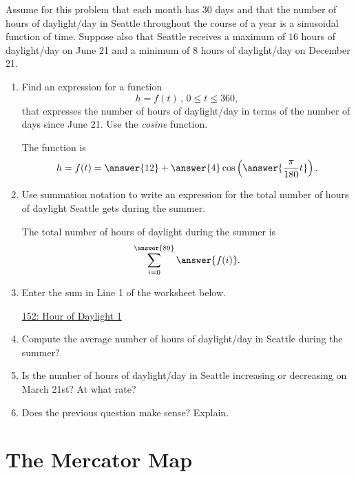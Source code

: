 \documentclass{ximera}
\begin{document}
\begin{exercise} \label{EXIIU4349se9}
Assume for this problem that each month has 30 days and that the number of hours of daylight/day in Seattle throughout the course of a year is a sinusoidal function of time. Suppose also that Seattle receives a maximum of $16$ hours of daylight/day on June 21 and a minimum of $8$ hours of daylight/day on December 21.

\begin{enumerate}
\item Find an expression for a function
\[
        h = f(t) \, , \, 0\leq t \leq 360 ,
\]
that expresses the number of hours of daylight/day in terms of the number of days since June 21. Use the \emph{cosine} function.

The function is
\[
    h = f(t) = \answer{12} + \answer{4}\cos \left(  \answer{\frac{\pi}{180}t} \right) .
\]

\item Use summation notation to write an expression for the total number of hours of daylight Seattle gets during the summer. 

The total number of hours of daylight during the summer is
\[
    \sum_{i=0}^{\answer{89}} \answer{f(i)} .
\]

\item Enter the sum in Line 1 of the worksheet below.

\begin{onlineOnly}
    \begin{center}
\end{center}
\end{onlineOnly}

\href{https://www.desmos.com/calculator/jvwyqn0vbj}{152: Hour of Daylight 1}

\item Compute the average number of hours of daylight/day in Seattle during the summer?

\item Is the number of hours of daylight/day in Seattle increasing or decreasing on March 21st? At what rate?

\item Does the previous question make sense? Explain.
\end{enumerate}
\end{exercise}

\section{The Mercator Map}
\end{document}
